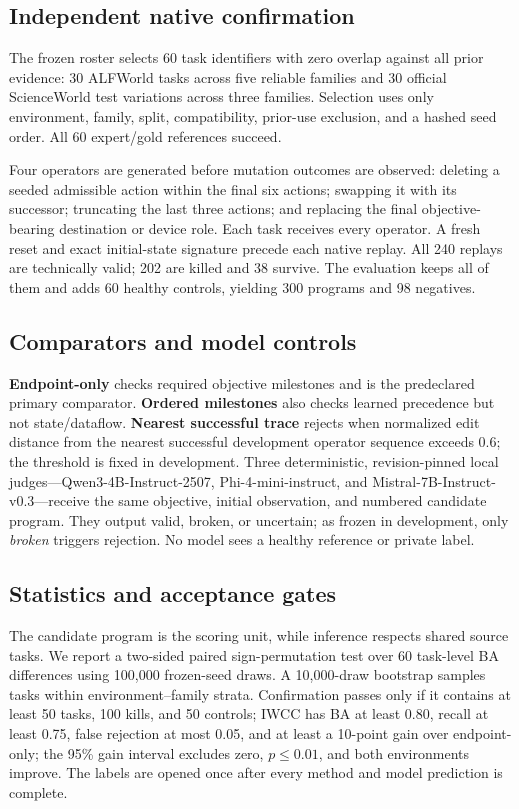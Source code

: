 \documentclass[pdflatex,sn-basic]{sn-jnl}
\newcommand{\TaskCount}{60}
\newcommand{\CandidateCount}{300}
\newcommand{\ControlCount}{98}
\begin{document}
\subsection{Independent native confirmation}
The frozen roster selects \TaskCount{} task identifiers with zero overlap against all prior evidence: 30 ALFWorld tasks across five reliable families and 30 official ScienceWorld test variations across three families. Selection uses only environment, family, split, compatibility, prior-use exclusion, and a hashed seed order. All 60 expert/gold references succeed.

Four operators are generated before mutation outcomes are observed: deleting a seeded admissible action within the final six actions; swapping it with its successor; truncating the last three actions; and replacing the final objective-bearing destination or device role. Each task receives every operator. A fresh reset and exact initial-state signature precede each native replay. All 240 replays are technically valid; 202 are killed and 38 survive. The evaluation keeps all of them and adds 60 healthy controls, yielding \CandidateCount{} programs and \ControlCount{} negatives.

\subsection{Comparators and model controls}
\textbf{Endpoint-only} checks required objective milestones and is the predeclared primary comparator. \textbf{Ordered milestones} also checks learned precedence but not state/dataflow. \textbf{Nearest successful trace} rejects when normalized edit distance from the nearest successful development operator sequence exceeds 0.6; the threshold is fixed in development. Three deterministic, revision-pinned local judges---Qwen3-4B-Instruct-2507, Phi-4-mini-instruct, and Mistral-7B-Instruct-v0.3---receive the same objective, initial observation, and numbered candidate program. They output valid, broken, or uncertain; as frozen in development, only \emph{broken} triggers rejection. No model sees a healthy reference or private label.

\subsection{Statistics and acceptance gates}
The candidate program is the scoring unit, while inference respects shared source tasks. We report a two-sided paired sign-permutation test over 60 task-level BA differences using 100,000 frozen-seed draws. A 10,000-draw bootstrap samples tasks within environment--family strata. Confirmation passes only if it contains at least 50 tasks, 100 kills, and 50 controls; IWCC has BA at least 0.80, recall at least 0.75, false rejection at most 0.05, and at least a 10-point gain over endpoint-only; the 95\% gain interval excludes zero, $p\le0.01$, and both environments improve. The labels are opened once after every method and model prediction is complete.
\end{document}
